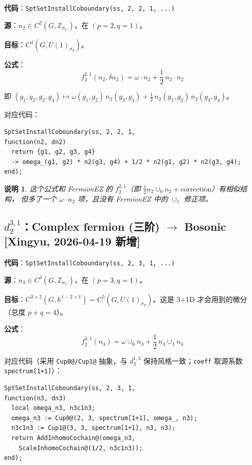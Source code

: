 \documentclass[a4paper,fontset=ubuntu,12pt]{ctexart}
\newtheorem{remark}[definition]{说明}
\newcommand{\ZZ}{\mathbb{Z}}
\newcommand{\aT}{\sigma_T}
\newcommand{\aC}{\sigma_C}
\begin{document}
\textbf{代码}：\texttt{SptSetInstallCoboundary(ss, 2, 2, 1, ...)}

\textbf{源}：$n_2 \in C^2(G, \ZZ_{\aC})$，在 $(p = 2, q = 1)$。

\textbf{目标}：$C^4(G, U(1)_{\aT})$。

\textbf{公式}：
\begin{equation}
\label{eq:d2-21}
\boxed{f_2^{2,1}(n_2, \delta n_2) = \omega \cdot n_2 + \frac{1}{2}\, n_2 \cdot n_2}
\end{equation}

即 $(g_1, g_2, g_3, g_4) \mapsto \omega(g_1, g_2)\, n_2(g_3, g_4) + \frac{1}{2}\, n_2(g_1, g_2)\, n_2(g_3, g_4)$。

对应代码：
\begin{lstlisting}
SptSetInstallCoboundary(ss, 2, 2, 1,
function(n2, dn2)
  return {g1, g2, g3, g4}
  -> omega_(g1, g2) * n2(g3, g4) + 1/2 * n2(g1, g2) * n2(g3, g4);
end);
\end{lstlisting}

\begin{remark}
这个公式和 FermionEZ 的 $f_2^{2,1}$（即 $\frac{1}{2} n_2 \cup_0 n_2 + \text{correction}$）有相似结构，
但多了一个 $\omega \cdot n_2$ 项，且没有 FermionEZ 中的 $\cup_1$ 修正项。
\end{remark}

\subsection{\texorpdfstring{$d_2^{3,1}$}{d2(3,1)}：Complex fermion (三阶) $\to$ Bosonic \textmd{[Xingyu, 2026-04-19 新增]}}
\label{sec:d2-31}

\textbf{代码}：\texttt{SptSetInstallCoboundary(ss, 2, 3, 1, ...)}

\textbf{源}：$n_3 \in C^3(G, \ZZ_{\aC})$，在 $(p = 3, q = 1)$。

\textbf{目标}：$C^{3+2}(G, h^{1-2+1}) = C^5(G, U(1)_{\aT})$。这是 3+1D 才会用到的微分（总度 $p+q = 4$）。

\textbf{公式}：
\begin{equation}
\label{eq:d2-31}
\boxed{f_2^{3,1}(n_3) = \omega \cup_0 n_3 + \frac{1}{2}\, n_3 \cup_1 n_3}
\end{equation}

对应代码（采用 \texttt{Cup0@/Cup1@} 抽象，与 $d_3^{1,3}$ 保持风格一致；\texttt{coeff} 取源系数 \texttt{spectrum[1+1]}）：
\begin{lstlisting}
SptSetInstallCoboundary(ss, 2, 3, 1,
function(n3, dn3)
  local omega_n3, n3c1n3;
  omega_n3 := Cup0@(2, 3, spectrum[1+1], omega_, n3);
  n3c1n3 := Cup1@(3, 3, spectrum[1+1], n3, n3);
  return AddInhomoCochain@(omega_n3,
    ScaleInhomoCochain@(1/2, n3c1n3));
end);
\end{lstlisting}
\end{document}
